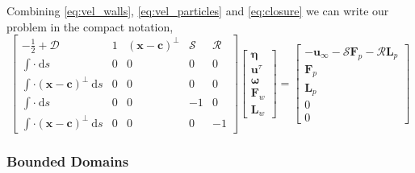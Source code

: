 \documentclass[preprint, 10pt]{elsarticle}
\begin{document}
Combining \eqref{eq:vel_walls}, \eqref{eq:vel_particles} and \eqref{eq:closure} we can write our problem in the compact notation,
\begin{equation}\label{eq:stokes_unbounded} \begin{bmatrix} -\frac{1}{2} + \mathcal{D} & 1 & (\mathbf{x}-\mathbf{c})^\perp & \mathcal{S} & \mathcal{R}\\
		\int \cdot~ \text{d}s & 0 & 0 & 0 & 0\\
		\int\cdot(\mathbf{x}-\mathbf{c})^\perp~\text{d}s & 0 & 0 & 0 & 0\\
		\int \cdot~ \text{d}s & 0 & 0 & - 1 & 0\\
		\int\cdot(\mathbf{x}-\mathbf{c})^\perp~\text{d}s & 0 & 0 & 0 & -1\end{bmatrix}
\begin{bmatrix}
	\pmb{\eta}\\\mathbf{u}^\tau \\ \pmb{\omega} \\ \mathbf{F}_w \\\mathbf{ L}_w
\end{bmatrix}
=
\begin{bmatrix}
	-\mathbf{u}_{\infty} - \mathcal{S}\mathbf{F}_p - \mathcal{R}\mathbf{L}_p\\
	\mathbf{F}_p\\
	\mathbf{L}_p\\
	0\\
	0
\end{bmatrix}
\end{equation}

\subsubsection{Bounded Domains}
\end{document}
